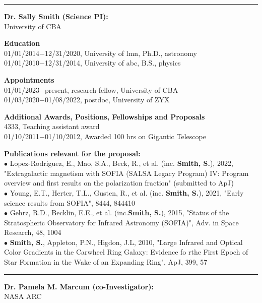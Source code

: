 \medskip \hrule \vspace{5pt} \medskip
\textbf{\color{Blue}\large Dr. Sally Smith (Science PI):}\\
University of CBA
\par \vspace{-0.5em}
\textbf{Education}\\
01/01/2014$-$12/31/2020, University of lmn, Ph.D., astronomy\\
01/01/2010$-$12/31/2014, University of abc, B.S., physics
\par \vspace{-0.5em}
\textbf{Appointments}\\
01/01/2023$-$present, research fellow, University of CBA\\
01/03/2020$-$01/08/2022, postdoc, University of ZYX
\par \vspace{-0.5em}
\textbf{Additional Awards, Positions, Fellowships and Proposals}\\
4333, Teaching assistant award\\
01/10/2011$-$01/10/2012, Awarded 100 hrs on Gigantic Telescope
\par \vspace{-0.5em}
\textbf{Publications relevant for the proposal:}\\
{\scriptsize{$\bullet$}} Lopez-Rodriguez, E., Mao, S.A., Beck, R., et al. (inc. \textbf{Smith, S.}), 2022, "Extragalactic magnetism with SOFIA (SALSA Legacy Program) IV: Program overview and first results on the polarization fraction" (submitted to ApJ)\\
{\scriptsize{$\bullet$}} Young, E.T., Herter, T.L., Gusten, R., et al. (inc. \textbf{Smith, S.}), 2021, "Early science results from SOFIA", 8444, 844410\\
{\scriptsize{$\bullet$}} Gehrz, R.D., Becklin, E.E., et al. (inc.\textbf{Smith, S.}), 2015, "Status of the Stratospheric Observatory for Infrared Astronomy (SOFIA)", Adv. in Space Research, 48, 1004\\
{\scriptsize{$\bullet$}} \textbf{Smith, S.}, Appleton, P.N., Higdon, J.L, 2010, "Large Infrared and Optical Color Gradients in the Carwheel Ring Galaxy: Evidence fo rthe First Epoch of Star Formation in the Wake of an Expanding Ring", ApJ, 399, 57
\medskip \hrule \vspace{5pt} \medskip
\textbf{\color{Blue}\large Dr. Pamela M. Marcum (co-Investigator):}\\
NASA ARC
\par \vspace{-0.5em}
